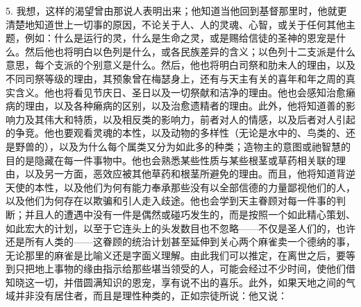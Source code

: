 5. 我想，这样的渴望曾由那说人表明出来；他知道当他回到基督那里时，他就更清楚地知道世上一切事的原因，不论关于人、人的灵魂、心智，或关于任何其他主题，例如：什么是运行的灵，什么是生命之灵，或是赐给信徒的圣神的恩宠是什么。然后他也将明白以色列是什么，或各民族差异的含义；以色列十二支派是什么意思，每个支派的个别意义是什么。然后，他也将明白司祭和肋未人的理由，以及不同司祭等级的理由，其预象曾在梅瑟身上，还有与天主有关的喜年和年之周的真实含义。他也将看见节庆日、圣日以及一切祭献和洁净的理由。他也会感知治愈癞病的理由，以及各种癞病的区别，以及治愈遗精者的理由。此外，他将知道善的影响力及其伟大和特质，以及相反类的影响力，前者对人的情感，以及后者对人引起的争竞。他也要观看灵魂的本性，以及动物的多样性（无论是水中的、鸟类的、还是野兽的），以及为什么每个属类又分为如此多的种类；造物主的意图或祂智慧的目的是隐藏在每一件事物中。他也会熟悉某些性质与某些根茎或草药相关联的理由，以及另一方面，恶效应被其他草药和根茎所避免的理由。而且，他将知道背逆天使的本性，以及他们为何有能力奉承那些没有以全部信德的力量鄙视他们的人，以及他们为何存在以欺骗和引人走入歧途。他也会学到天主眷顾对每一件事的判断；并且人的遭遇中没有一件是偶然或碰巧发生的，而是按照一个如此精心策划、如此宏大的计划，以至于它连头上的头发数目也不忽略——不仅是圣人们的，也许还是所有人类的——这眷顾的统治计划甚至延伸到关心两个麻雀卖一个德纳的事，无论那里的麻雀是比喻义还是字面义理解。由此我们可以推定，在离世之后，要等到只把地上事物的缘由指示给那些堪当领受的人，可能会经过不少时间，使他们借知晓这一切，并借圆满知识的恩宠，享有说不出的喜乐。此外，如果天地之间的气域并非没有居住者，而且是理性种类的，正如宗徒所说：他又说：\par

